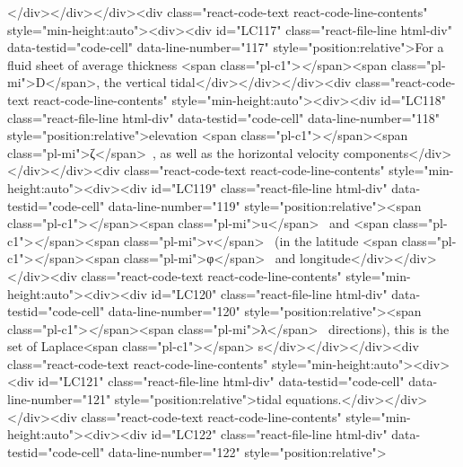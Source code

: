 {{</div></div></div><div class="react-code-text react-code-line-contents" style="min-height:auto"><div><div id="LC117" class="react-file-line html-div" data-testid="code-cell" data-line-number="117" style="position:relative">For a fluid sheet of average thickness <span class="pl-c1">\emph</span>{<span class="pl-mi">D</span>}, the vertical tidal</div></div></div><div class="react-code-text react-code-line-contents" style="min-height:auto"><div><div id="LC118" class="react-file-line html-div" data-testid="code-cell" data-line-number="118" style="position:relative">elevation <span class="pl-c1">\emph</span>{<span class="pl-mi">ζ</span>}~, as well as the horizontal velocity components</div></div></div><div class="react-code-text react-code-line-contents" style="min-height:auto"><div><div id="LC119" class="react-file-line html-div" data-testid="code-cell" data-line-number="119" style="position:relative"><span class="pl-c1">\emph</span>{<span class="pl-mi">u</span>}~ and <span class="pl-c1">\emph</span>{<span class="pl-mi">v</span>}~ (in the latitude <span class="pl-c1">\emph</span>{<span class="pl-mi">φ</span>}~ and longitude</div></div></div><div class="react-code-text react-code-line-contents" style="min-height:auto"><div><div id="LC120" class="react-file-line html-div" data-testid="code-cell" data-line-number="120" style="position:relative"><span class="pl-c1">\emph</span>{<span class="pl-mi">λ</span>}~ directions), this is the set of Laplace<span class="pl-c1">\textquotesingle</span> s</div></div></div><div class="react-code-text react-code-line-contents" style="min-height:auto"><div><div id="LC121" class="react-file-line html-div" data-testid="code-cell" data-line-number="121" style="position:relative">tidal equations.</div></div></div><div class="react-code-text react-code-line-contents" style="min-height:auto"><div><div id="LC122" class="react-file-line html-div" data-testid="code-cell" data-line-number="122" style="position:relative">
}}
